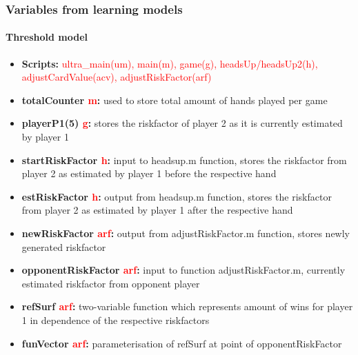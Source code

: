 \documentclass[11pt]{article}
\begin{document}
\subsubsection{Variables from learning models}
\paragraph{Threshold model}
\begin{itemize}
\item	\textbf{Scripts:} \textcolor{red}{ultra\_main(um), main(m), game(g), headsUp/headsUp2(h), adjustCardValue(acv), adjustRiskFactor(arf)} \\

\item	\textbf{totalCounter \textcolor{red}{m}:} used to store total amount of hands played per game  \\

\item	\textbf{playerP1(5) \textcolor{red}{g}:} stores the riskfactor of player 2 as it is currently estimated by player 1  \\

\item	\textbf{startRiskFactor \textcolor{red}{h}:} input to headsup.m function, stores the riskfactor from player 2 as estimated by player 1 before the respective hand  \\

\item	\textbf{estRiskFactor \textcolor{red}{h}:} output from headsup.m function, stores the riskfactor from player 2 as estimated by player 1 after the respective hand   \\

\item	\textbf{newRiskFactor \textcolor{red}{arf}:}  output from adjustRiskFactor.m function, stores newly generated riskfactor\\

\item	\textbf{opponentRiskFactor \textcolor{red}{arf}:} input to function adjustRiskFactor.m, currently estimated riskfactor from opponent player \\

\item	\textbf{refSurf \textcolor{red}{arf}:} two-variable function which represents amount of wins for player 1 in dependence of the respective riskfactors \\

\item	\textbf{funVector \textcolor{red}{arf}:} parameterisation of refSurf at point of opponentRiskFactor \\

\end{itemize}
\end{document}
